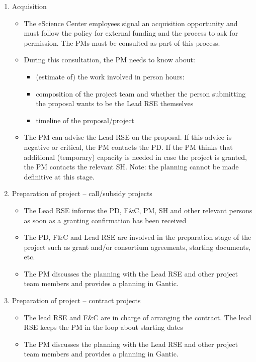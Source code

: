 \begin{enumerate}[label=\arabic*.,ref=\arabic*]
\item Acquisition
\begin{itemize}
\item The eScience Center employees signal an acquisition opportunity and must follow the policy for
external funding and the process to ask for permission. The PMs must be consulted as part of this process.
\item During this consultation, the PM needs to know about:
\begin{itemize}
\item (estimate of) the work involved in person hours:
\item composition of the project team and whether the person submitting the proposal wants to be the Lead RSE themselves
\item timeline of the proposal/project
\end{itemize}
\item The PM can advise the Lead RSE on the proposal. If this advice is negative or critical, the PM
contacts the PD. If the PM thinks that additional (temporary) capacity is needed in case the project is granted, the PM
contacts the relevant SH. Note: the planning cannot be made definitive at this stage.
\end{itemize}
\item Preparation of project – call/subsidy projects
\begin{itemize}
\item The Lead RSE informs the PD, F\&C, PM, SH and other relevant persons as soon as a granting
confirmation has been received
\item The PD, F\&C and Lead RSE are involved in the preparation stage of the project such as grant
and/or consortium agreements, starting documents, etc.
\item The PM discusses the planning with the Lead RSE and other project team members and provides a
planning in Gantic.
\end{itemize}
\item Preparation of project – contract projects
\begin{itemize}
\item The lead RSE and F\&C are in charge of arranging the contract. The lead RSE keeps the PM in
the loop about starting dates
\item The PM discusses the planning with the Lead RSE and other project team members and provides a
planning in Gantic.
\end{itemize}

\end{enumerate}
